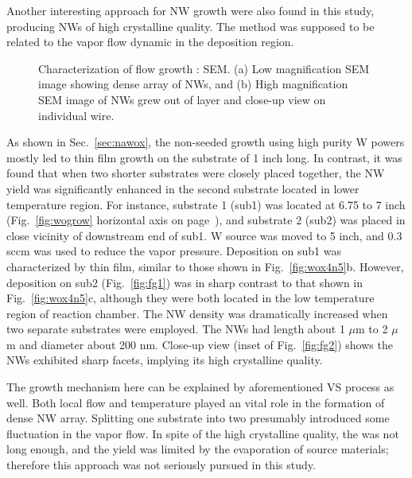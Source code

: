 Another interesting approach for  NW growth were also found in this study, producing  NWs of high crystalline quality. The method was supposed to be related to the vapor flow dynamic in the deposition region. 
\begin{figure}[htb]
\centering
{}\hspace{0.04\textwidth}
\caption[Characterization of flow growth : SEM]{Characterization of flow growth : SEM. (a) Low magnification SEM image showing dense array of NWs, and (b) High magnification SEM image of NWs grew out of layer and close-up view on individual wire.}
\label{fig:wogrowsf}
\end{figure}
As shown in Sec.~\ref{sec:nawox}, the non-seeded growth using high purity W powers mostly led to thin film growth on the substrate of 1 inch long. In contrast, it was found that when two shorter substrates were closely placed together, the  NW yield was significantly enhanced in the second substrate located in lower temperature region. For instance, substrate 1 (sub1) was located at 6.75 to 7 inch (Fig.~\ref{fig:wogrow} horizontal axis on page~\pageref{fig:wogrow}), and substrate 2 (sub2) was placed in close vicinity of downstream end of sub1. W source was moved to 5 inch, and 0.3 sccm  was used to reduce the  vapor pressure. Deposition on sub1 was characterized by thin film, similar to those shown in Fig.~\ref{fig:wox4n5}b. However, deposition on sub2 (Fig.~\ref{fig:fg1}) was in sharp contrast to that shown in Fig.~\ref{fig:wox4n5}c, although they were both located in the low temperature region of reaction chamber. The NW density was dramatically increased when two separate substrates were employed. The NWs had length about 1 $\mu$m to 2 $\mu$m and diameter about 200 nm. Close-up view (inset of Fig.~\ref{fig:fg2}) shows the NWs exhibited sharp facets, implying its high crystalline quality.

The growth mechanism here can be explained by aforementioned VS process as well. Both local flow and temperature played an vital role in the formation of dense NW array. Splitting one substrate into two presumably introduced some fluctuation in the vapor flow. In spite of the high crystalline quality, the  was not long enough, and the yield was limited by the evaporation of source materials; therefore this approach was not seriously pursued in this study. 


